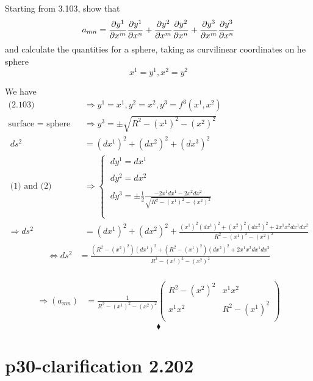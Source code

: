 \begin{tcolorbox}
Starting from 3.103, show that $$a_{mn} = \pdv{y^1}{x^m}\pdv{y^1}{x^n}+\pdv{y^2}{x^m}\pdv{y^2}{x^n}+\pdv{y^3}{x^m}\pdv{y^3}{x^n}$$ and calculate the quantities for a sphere, taking as curvilinear coordinates on he sphere $$x^1 = y^1 , x^2 = y^2$$
\end{tcolorbox}
We have
\begin{align}
\text{(2.103)}\quad &\Rightarrow y^1 = x^1 , y^2 = x^2, y^3 = f^3(x^1,x^2)\\
\text{surface = sphere}\quad &\Rightarrow y^3 = \pm \sqrt{R^2 -(x^1)^2-(x^2)^2}\\
\ ds^2 &= (dx^1)^2+(dx^2)^2+(dx^3)^2\\
\ \text{(1) and (2)}\quad& \Rightarrow \left\{ \begin{array}{c} 
\ dy^1 = dx^1\\\\
\ dy^2 = dx^2\\\\
\ dy^3 = \pm \frac{1}{2} \frac{-2x^1dx^1 - 2x^2dx^2}{\sqrt{R^2 -(x^1)^2-(x^2)^2}}\\\\
\end{array}
\right.\\
\Rightarrow ds^2 & = (dx^1)^2 +  (dx^2)^2 + \frac{(x^1)^2(dx^1)^2 + (x^2)^2(dx^2)^2  + 2 x^1x^2dx^1dx^2}{R^2 -(x^1)^2-(x^2)^2}
\end{align}
\begin{align}
\Leftrightarrow ds^2 & = \frac{(R^2 - (x^2)^2) (dx^1)^2 + (R^2 -(x^1)^2) (dx^2)^2  + 2 x^1x^2dx^1dx^2}{R^2 -(x^1)^2-(x^2)^2}
\end{align}\\
\begin{align}
\Rightarrow (a_{mn}) &= \frac{1}{R^2 -(x^1)^2-(x^2)^2}\begin{pmatrix}
 R^2 - (x^2)^2&x^1x^2 \\
x^1x^2 & R^2 - (x^1)^2 \\
\end{pmatrix}
\end{align}
$$\blacklozenge$$
\newpage


\section{p30-clarification 2.202}

